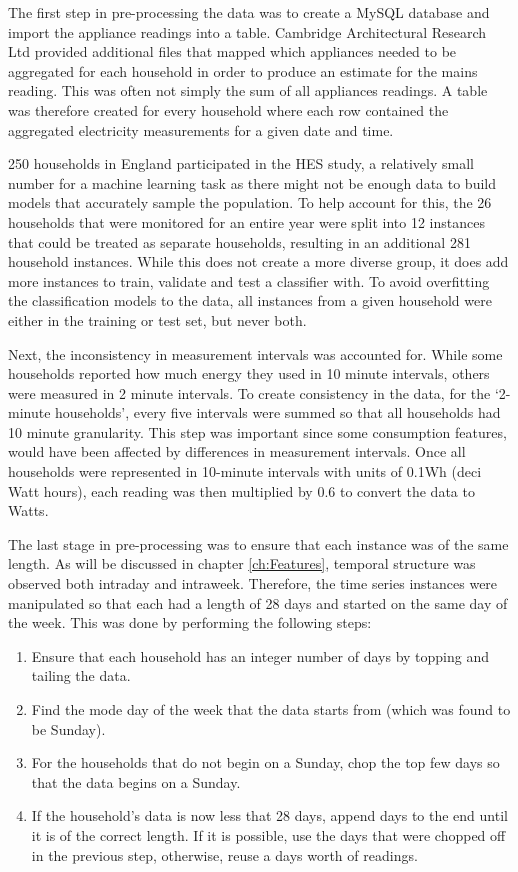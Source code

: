 The first step in pre-processing the data was to create a MySQL database and import the appliance readings into a table. Cambridge Architectural Research Ltd \cite{CARG_1} provided additional files that mapped which appliances needed to be aggregated for each household in order to produce an estimate for the mains reading. This was often not simply the sum of all appliances readings. A table was therefore created for every household where each row contained the aggregated electricity measurements for a given date and time. 

250 households in England participated in the HES study, a relatively small number for a machine learning task as there might not be enough data to build models that accurately sample the population. To help account for this, the 26 households that were monitored for an entire year were split into 12 instances that could be treated as separate households, resulting in an additional 281 household instances. While this does not create a more diverse group, it does add more instances to train, validate and test a classifier with. To avoid overfitting the classification models to the data, all instances from a given household were either in the training or test set, but never both.

Next, the inconsistency in measurement intervals was accounted for. While some households reported how much energy they used in 10 minute intervals, others were measured in 2 minute intervals. To create consistency in the data, for the `2-minute households', every five intervals were summed so that all households had 10 minute granularity. This step was important since some consumption features, would have been affected by differences in measurement intervals. Once all households were represented in 10-minute intervals with units of 0.1Wh (deci Watt hours), each reading was then multiplied by 0.6 to convert the data to Watts.

The last stage in pre-processing was to ensure that each instance was of the same length. As will be discussed in chapter \ref{ch:Features}, temporal structure was observed both intraday and intraweek. Therefore, the time series instances were manipulated so that each had a length of 28 days and started on the same day of the week. This was done by performing the following steps:

\begin{enumerate}
\item Ensure that each household has an integer number of days by topping and tailing the data.
\item Find the mode day of the week that the data starts from (which was found to be Sunday).
\item For the households that do not begin on a Sunday, chop the top few days so that the data begins on a Sunday.
\item If the household's data is now less that 28 days, append days to the end until it is of the correct length. If it is possible, use the days that were chopped off in the previous step, otherwise, reuse a days worth of readings.
\end{enumerate}

